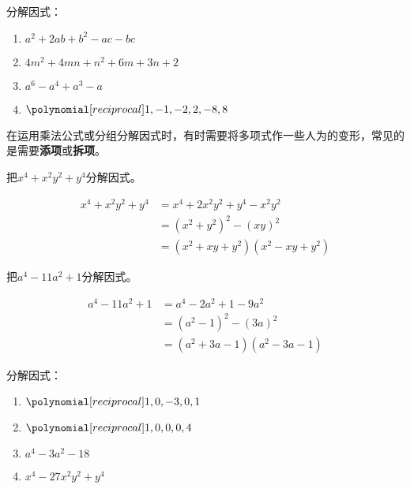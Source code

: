 \begin{ex}
 分解因式：
 \begin{enumerate}
     \item $a^2+2ab+b^2-ac-bc$
     \item $4m^2+4mn+n^2+6m+3n+2$
     \item $a^6-a^4+a^3-a$
     \item $\poly{1,-1,-2,2,-8,8}$
 \end{enumerate}   
\end{ex}

在运用乘法公式或分组分解因式时，有时需要将多项式作一些人为的变形，常见的是需要\textbf{添项}或\textbf{拆项}。

\begin{example}
    把$x^4+x^2y^2+y^4$分解因式。
\end{example}

\begin{solution}
\begin{align*}
    x^4+x^2y^2+y^4&=x^4+2x^2y^2+y^4 -x^2y^2 \tag{添项}\\
    &=(x^2+y^2)^2-(xy)^2\\
    &=(x^2+xy+y^2)(x^2-xy+y^2)
\end{align*}   
\end{solution}


\begin{example}
    把$a^4-11a^2+1$分解因式。
\end{example}

\begin{solution}
    \begin{align*}
        a^4-11a^2+1&=a^4-2a^2+1-9a^2 \tag{拆项}\\
        &=(a^2-1)^2-(3a)^2\\
        &=(a^2+3a-1)(a^2-3a-1)
    \end{align*}     
\end{solution}

\begin{ex}
    分解因式：
\begin{multicols}{2}
\begin{enumerate}
\item $\poly{1,0,-3,0,1}$
\item $\poly{1,0,0,0,4}$
\item $a^4-3a^2-18$
\item $x^4-27x^2y^2+y^4$
\end{enumerate}
\end{multicols}
\end{ex}

